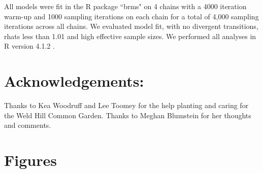 \documentclass{article}[12pt]
\begin{document}
{All models were fit in the R package ``brms" \citep{Burkner2018} on 4 chains with a 4000 iteration warm-up and 1000 sampling iterations on each chain for a total of 4,000 sampling iterations across all chains. We evaluated model fit, with no divergent transitions, rhats less than 1.01 and high effective sample sizes. We performed all analyses in R version 4.1.2 \citep{R2021}.

\section{Acknowledgements:}
Thanks to Kea Woodruff and Lee Toomey for the help planting and caring for the Weld Hill Common Garden. Thanks to Meghan Blumstein for her thoughts and comments.

\newpage
\section{Figures} %

}
\end{document}

